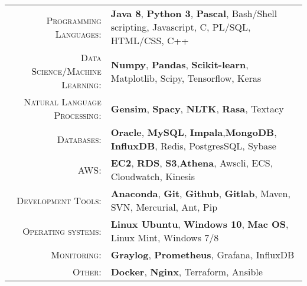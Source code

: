 %
%
%

\renewcommand{\arraystretch}{1.1}
	\begin{tabular}{>{}r>{}p{13cm}} 
		\textsc{Programming Languages:}  		&   \textbf{Java 8}, \textbf{Python 3}, \textbf{Pascal}, Bash/Shell scripting, Javascript, C, PL/SQL,  HTML/CSS, C++\\ 
		\textsc{Data Science/Machine Learning:}                  &   \textbf{Numpy}, \textbf{Pandas}, \textbf{Scikit-learn}, Matplotlib, Scipy, Tensorflow, Keras\\
		\textsc{Natural Language Processing:} 	 & \textbf{Gensim}, \textbf{Spacy}, \textbf{NLTK}, \textbf{Rasa}, Textacy\\
		\textsc{Databases:}                  &   \textbf{Oracle}, \textbf{MySQL}, \textbf{Impala},\textbf{MongoDB}, \textbf{InfluxDB}, Redis, PostgresSQL, Sybase \\ 		
		\textsc{AWS:}                  &   \textbf{EC2}, \textbf{RDS}, \textbf{S3},\textbf{Athena}, Awscli, ECS, Cloudwatch, Kinesis \\ 
		\textsc{Development Tools:} & 	  		\textbf{Anaconda}, \textbf{Git}, \textbf{Github}, \textbf{Gitlab}, Maven, SVN, Mercurial, Ant, Pip \\		
		\textsc{Operating systems:}	        &   \textbf{Linux Ubuntu}, \textbf{Windows 10}, \textbf{Mac OS}, Linux Mint, Windows 7/8\\ 
		\textsc{Monitoring:}                  &   \textbf{Graylog}, \textbf{Prometheus}, Grafana, InfluxDB\\ 
		\textsc{Other:}				        &   \textbf{Docker}, \textbf{Nginx}, Terraform, Ansible\\

	\end{tabular}